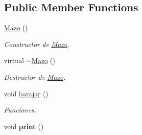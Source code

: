 \subsection*{Public Member Functions}
\begin{DoxyCompactItemize}
\item 
\hypertarget{class_mazo_a93eaa35af9ad42840c3a37d4054ba17d}{\hyperlink{class_mazo_a93eaa35af9ad42840c3a37d4054ba17d}{Mazo} ()}\label{class_mazo_a93eaa35af9ad42840c3a37d4054ba17d}

\begin{DoxyCompactList}\small\item\em Constructor de \hyperlink{class_mazo}{Mazo}. \end{DoxyCompactList}\item 
\hypertarget{class_mazo_a2ce07ca90c706e6454ac54d727d3da2a}{virtual \hyperlink{class_mazo_a2ce07ca90c706e6454ac54d727d3da2a}{$\sim$\+Mazo} ()}\label{class_mazo_a2ce07ca90c706e6454ac54d727d3da2a}

\begin{DoxyCompactList}\small\item\em Destructor de \hyperlink{class_mazo}{Mazo}. \end{DoxyCompactList}\item 
\hypertarget{class_mazo_ad73b15de8ae06e4e7aaecd97626bbe21}{void \hyperlink{class_mazo_ad73b15de8ae06e4e7aaecd97626bbe21}{barajar} ()}\label{class_mazo_ad73b15de8ae06e4e7aaecd97626bbe21}

\begin{DoxyCompactList}\small\item\em Funciones. \end{DoxyCompactList}\item 
\hypertarget{class_mazo_a423b1b45f04d64d2507879b2662deb51}{void {\bfseries print} ()}\label{class_mazo_a423b1b45f04d64d2507879b2662deb51}

\end{DoxyCompactItemize}
